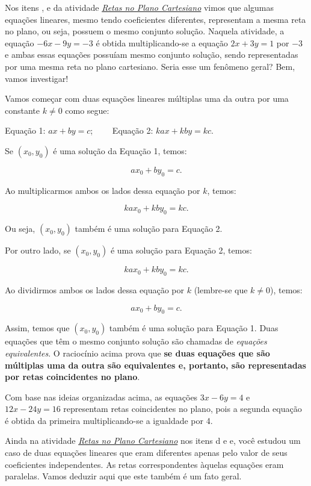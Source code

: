 Nos itens ,  e  da atividade \hyperref[retas]{\textit{Retas no Plano Cartesiano}} vimos que algumas equações lineares, mesmo tendo coeficientes diferentes, representam a mesma reta no plano, ou seja, possuem o mesmo conjunto solução. Naquela atividade, a equação $-6x - 9y = -3$ é obtida multiplicando-se a equação $2x + 3y = 1$ por $-3$ e ambas essas equações possuíam mesmo conjunto solução, sendo representadas por uma mesma reta no plano cartesiano. Seria esse um fenômeno geral? Bem, vamos investigar!

\begin{example}{}
 Vamos começar com duas equações lineares múltiplas uma da outra por uma constante $k\neq0$ como segue:

\begin{center}
Equação 1: $ax+by=c$;  \ \ \ \ Equação 2: $kax+kby=kc$.
\end{center}

Se $(x_0,y_0)$ é uma solução da Equação 1, temos:

$$ax_0 +by_0=c.$$

Ao multiplicarmos ambos os lados dessa equação por $k$, temos:

$$kax_0 +kby_0=kc.$$

Ou seja, $(x_0,y_0)$ também é uma solução para Equação 2.

Por outro lado, se $(x_0,y_0)$ é uma solução para Equação 2, temos:

$$kax_0 +kby_0=kc.$$

Ao dividirmos ambos os lados dessa equação por $k$ (lembre-se que $k\neq 0$), temos:

$$ax_0 +by_0=c.$$

Assim, temos que $(x_0,y_0)$ também é uma solução para Equação 1. Duas equações que têm o mesmo conjunto solução são chamadas de \emph{equações equivalentes}. O raciocínio acima prova que \textbf{se duas equações que são múltiplas uma da outra são equivalentes e, portanto, são representadas por retas coincidentes no plano}. 
\end{example}

Com base nas ideias organizadas acima, as equações $3x - 6y = 4$ e $12x - 24y = 16$ representam retas coincidentes no plano, pois a segunda equação é obtida da primeira multiplicando-se a igualdade por 4.

Ainda na atividade \textit{\hyperref[retas]{Retas no Plano Cartesiano}} nos itens d e e, você estudou um caso de duas equações lineares que eram diferentes apenas pelo valor de seus coeficientes independentes. As retas correspondentes àquelas equações eram paralelas. Vamos deduzir aqui que este também é um fato geral. 


